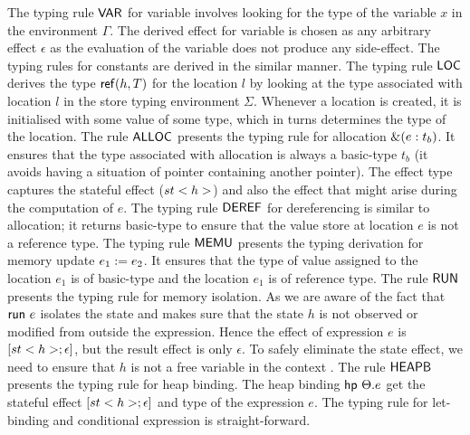 The typing rule ${\mathsf{VAR}}$ for variable involves looking for the type of the variable $x$ in the environment $\Gamma$. The derived effect for variable is chosen as any arbitrary effect $\epsilon$ as the evaluation of the variable does not produce any side-effect. The typing rules for constants are derived in the similar manner. The typing rule ${\mathsf{LOC}}$ derives the type ${\mathsf{ref}}(h, T)$ for the location $l$ by looking at the type associated with location $l$ in the store typing environment $\Sigma$. Whenever a location is created, it is initialised with some value of some type, which in turns determines the type of the location. The rule ${\mathsf{ALLOC}}$ presents the typing rule for allocation $\&{(e : t_b)}$. It ensures that the type associated with allocation is always a basic-type $t_b$ (it avoids having a situation of pointer containing another pointer). The effect type captures the stateful effect ($st<h>$) and also the effect that might arise during the computation of $e$. The typing rule ${\mathsf{DEREF}}$ for dereferencing is similar to allocation; it returns basic-type to ensure that the value store at location $e$ is not a reference type. The typing rule ${\mathsf{MEMU}}$ presents the typing derivation for memory update $e_1 :=e_2$. It ensures that the type of value assigned to the location $e_1$ is of basic-type and the location $e_1$ is of reference type. The rule ${\mathsf{RUN}}$ presents the typing rule for memory isolation. As we are aware of the fact that ${\mathsf{run}}\ {e}$ isolates the state and makes sure that the state $h$ is not observed or modified from outside the expression. Hence the effect of expression $e$ is ${[st<h>; \epsilon]}$, but the result effect is only $\epsilon$. To safely eliminate the state effect, we need to ensure that $h$ is not a free variable in the context . The rule ${\mathsf{HEAPB}}$ presents the typing rule for heap binding. The heap binding ${{\mathsf{hp}}\ {\Theta}.{e}}$ get the stateful effect $[st<h>; \epsilon]$ and type of the expression $e$. The typing rule for let-binding and conditional expression is straight-forward.

